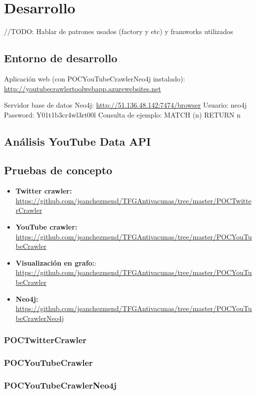 \documentclass[11pt,a4paper]{article}
\begin{document}
\section{Desarrollo}
\bigskip

//TODO: Hablar de patrones usados (factory y etc) y framworks utilizados
\subsection{Entorno de desarrollo}
Aplicación web (con POCYouTubeCrawlerNeo4j instalado):
\url{http://youtubecrawlertoolwebapp.azurewebsites.net} 

Servidor base de datos Neo4j:
\url{http://51.136.48.142:7474/browser} 
Usuario: neo4j
Password: Y01t1b3cr4wl3rt00l
Consulta de ejemplo: MATCH (n) RETURN n
\medskip 

\subsection{Análisis YouTube Data API}\label{youTubeDataAPI} 
\medskip 

\subsection{Pruebas de concepto}
\begin{itemize}
\item \textbf{Twitter crawler:} \url{https://github.com/jsanchezmend/TFGAntivacunas/tree/master/POCTwitterCrawler}
\item \textbf{YouTube crawler:} \url{https://github.com/jsanchezmend/TFGAntivacunas/tree/master/POCYouTubeCrawler}
\item \textbf{Visualización en grafo:}: \url{https://github.com/jsanchezmend/TFGAntivacunas/tree/master/POCYouTubeCrawler}
\item \textbf{Neo4j:} \url{https://github.com/jsanchezmend/TFGAntivacunas/tree/master/POCYouTubeCrawlerNeo4j}
\end{itemize}
\medskip 

\subsubsection{POCTwitterCrawler}
\medskip 

\subsubsection{POCYouTubeCrawler}
\medskip 

\subsubsection{POCYouTubeCrawlerNeo4j}
\medskip 
\end{document}
